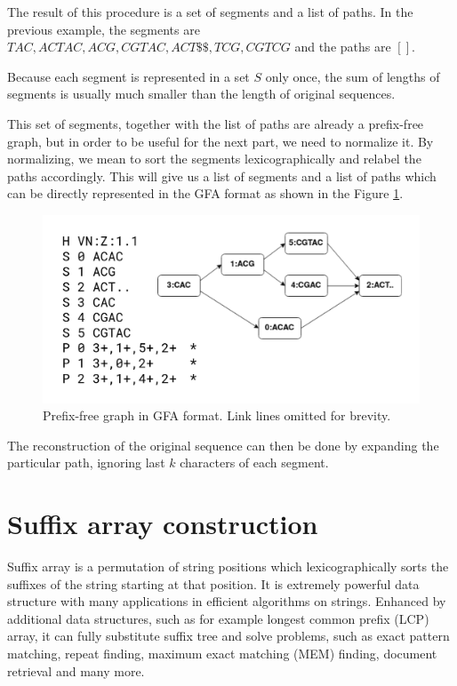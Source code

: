\documentclass[twocolumn]{ceurart}
\begin{document}
The result of this procedure is a set of segments and a list of paths.
In the previous example, the segments are ${ TAC, ACTAC, ACG, CGTAC, ACT\$\$, TCG, CGTCG }$
and the paths are $[  ]$.

Because each segment is represented in a set $S$ only once, the sum of lengths
of segments is usually much smaller than the length of original sequences.

This set of segments, together with the list of paths are already a prefix-free
graph, but in order to be useful for the next part, we need to normalize it.
By normalizing, we mean to sort the segments lexicographically and relabel the
paths accordingly.
This will give us a list of segments and a list of paths which can be directly
represented in the GFA format as shown in the Figure \ref{fig:gfa}.

\begin{figure}
    \centering
    \includegraphics[width=\linewidth]{images/pfg_gfa.v3.png}
    \caption{Prefix-free graph in GFA format. Link lines omitted for brevity.}
    \label{fig:gfa}
\end{figure}


The reconstruction of the original sequence can then be done by expanding 
the particular path, ignoring last $k$ characters of each segment.

\section{Suffix array construction}
Suffix array is a permutation of string positions which lexicographically
sorts the suffixes of the string starting at that position.
It is extremely powerful data structure with many applications in efficient
algorithms on strings.
Enhanced by additional data structures, such as for example longest common
prefix (LCP) array, it can fully substitute suffix tree and solve problems,
such as exact pattern matching, repeat finding, maximum exact matching (MEM)
finding, document retrieval and many more.
\end{document}
